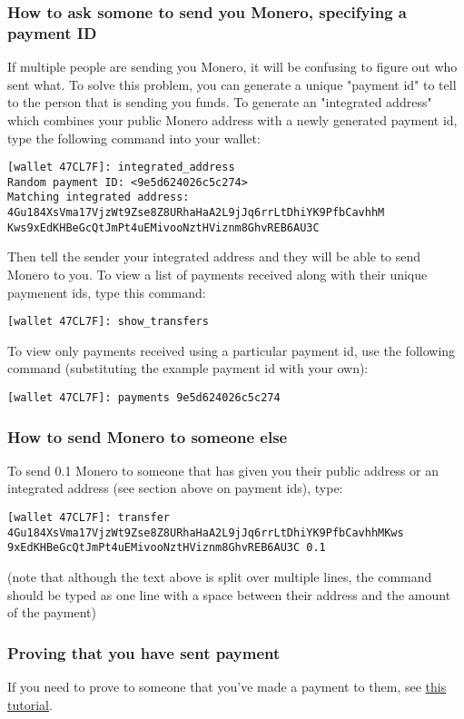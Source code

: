 \subsubsection{How to ask somone to send you Monero, specifying a payment ID}
	If multiple people are sending you Monero, it will be confusing to figure out who sent what. To solve this problem, you can generate a unique "payment id" to tell to the person that is sending you funds. To generate an "integrated address" which combines your public Monero address with a newly generated payment id, type the following command into your wallet:
\begin{lstlisting}
[wallet 47CL7F]: integrated_address
Random payment ID: <9e5d624026c5c274>
Matching integrated address: 4Gu184XsVma17VjzWt9Zse8Z8URhaHaA2L9jJq6rrLtDhiYK9PfbCavhhM Kws9xEdKHBeGcQtJmPt4uEMivooNztHViznm8GhvREB6AU3C
\end{lstlisting}
	Then tell the sender your integrated address and they will be able to send Monero to you. To view a list of payments received along with their unique paymenent ids, type this command:
\begin{lstlisting}
[wallet 47CL7F]: show_transfers
\end{lstlisting}
	To view only payments received using a particular payment id, use the following command (substituting the example payment id with your own):
\begin{lstlisting}
[wallet 47CL7F]: payments 9e5d624026c5c274
\end{lstlisting}
\subsubsection{How to send Monero to someone else}
	To send 0.1 Monero to someone that has given you their public address or an integrated address (see section above on payment ids), type:
\begin{lstlisting}
[wallet 47CL7F]: transfer 4Gu184XsVma17VjzWt9Zse8Z8URhaHaA2L9jJq6rrLtDhiYK9PfbCavhhMKws 9xEdKHBeGcQtJmPt4uEMivooNztHViznm8GhvREB6AU3C 0.1
\end{lstlisting}
	(note that although the text above is split over multiple lines, the command should be typed as one line with a space between their address and the amount of the payment)
\subsubsection{Proving that you have sent payment}
	If you need to prove to someone that you've made a payment to them, see \href{https://www.monero.how/tutorial-how-to-prove-payment}{this tutorial}.
